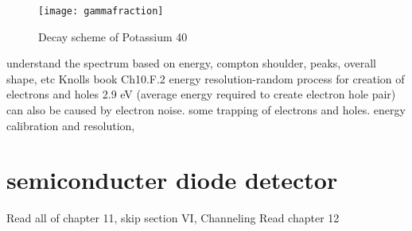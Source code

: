 \begin{figure}[htpb]
\centering
\texttt{[image: gammafraction]}
\caption{Decay scheme of Potassium 40}
\label{fig:gammafraction}
\end{figure}
understand the spectrum based on energy, compton shoulder, peaks, overall shape, etc Knolls book Ch10.F.2
energy resolution-random process for creation of electrons and holes 2.9 eV (average energy required to create electron hole pair) can also be caused by electron noise. some trapping of electrons and holes.
energy calibration and resolution,

\section{semiconducter diode detector} 
Read all of chapter 11, skip section VI, Channeling
Read chapter 12
